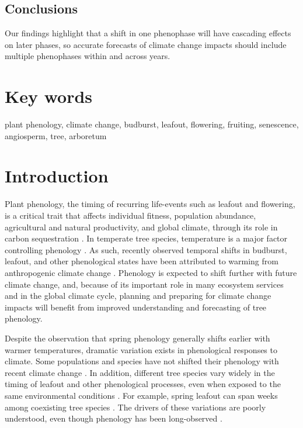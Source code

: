 \documentclass{article}
\begin{document}
\subsection*{Conclusions}
Our findings highlight that a shift in one phenophase will have cascading effects on later phases, so accurate forecasts of climate change impacts should include multiple phenophases within and across years. 

\section* {Key words}
plant phenology, climate change, budburst, leafout, flowering, fruiting, senescence, angiosperm, tree, arboretum
\section* {Introduction}
Plant phenology, the timing of recurring life-events such as leafout and flowering, is a critical trait that affects individual fitness, population abundance, agricultural and natural productivity, and global climate, through its role in carbon sequestration \citep{miller-rushing2008,primack2009a,willis2010,miller-rushing2010}.
 In temperate tree species, temperature is a major factor controlling phenology \citep{parmesan2006, morin2010,schwartz2013}. As such, recently observed temporal shifts in budburst, leafout, and other phenological states have been attributed to warming from anthropogenic climate change \citep{parmesan2006}. Phenology is expected to shift further with future climate change, and, because of its important role in many ecosystem services and in the global climate cycle, planning and preparing for climate change impacts will benefit from improved understanding and forecasting of tree phenology. %
\par Despite the observation that spring phenology generally shifts earlier with warmer temperatures, dramatic variation exists in phenological responses to climate. Some populations and species have not shifted their phenology with recent climate change \citep{wolkovich2012}. In addition, different tree species vary widely in the timing of leafout and other phenological processes, even when exposed to the same environmental conditions \citep{lechowicz1984,primack2009c}. For example, spring leafout can span weeks among coexisting tree species \citep{lechowicz1984}. The drivers of these variations are poorly understood, even though phenology has been long-observed \citep{wolkovich2014}.
\end{document}
